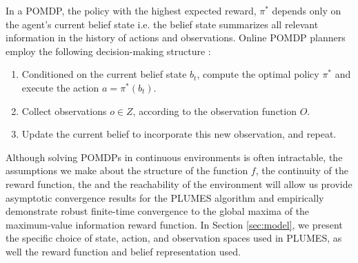 \documentclass{styles/svproc}
\begin{document}
In a POMDP, the policy with the highest expected reward, $\pi^*$ depends only on the agent's current belief state i.e. the belief state summarizes all relevant information in the history of actions and observations. Online POMDP planners employ the following decision-making structure \cite{russell2016artificial}:
\begin{enumerate}
   \item Conditioned on the current belief state $b_t$, compute the optimal policy $\pi^*$ and execute the action $a = \pi^*(b_t)$.
   \item Collect observations $o \in Z$, according to the observation function $O$.
   \item Update the current belief to incorporate this new observation, and repeat.
\end{enumerate}

Although solving POMDPs in continuous environments is often intractable, the assumptions we make about the structure of the function $f$, the continuity of the reward function, the  and the reachability of the environment will allow us provide asymptotic convergence results for the PLUMES algorithm and empirically demonstrate robust finite-time convergence to the global maxima of the maximum-value information reward function. In Section \ref{sec:model}, we present the specific choice of state, action, and observation spaces used in PLUMES, as well the reward function and belief representation used.



\end{document}
